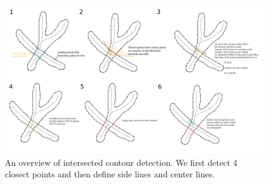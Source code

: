 \documentclass[review]{acmsiggraph}
\begin{document}
\label{sec:sidecut}

 \begin{figure}[h]
 	\begin{center}
 		\includegraphics[width =0.48 \paperwidth]{images/system/intersection.png}
 		\caption{An overview of intersected contour detection. We first detect 4 closect points and then define side lines and center lines. }
 		\label{fig:intersection}
 	\end{center}
 \end{figure}

%
%
\end{document}
